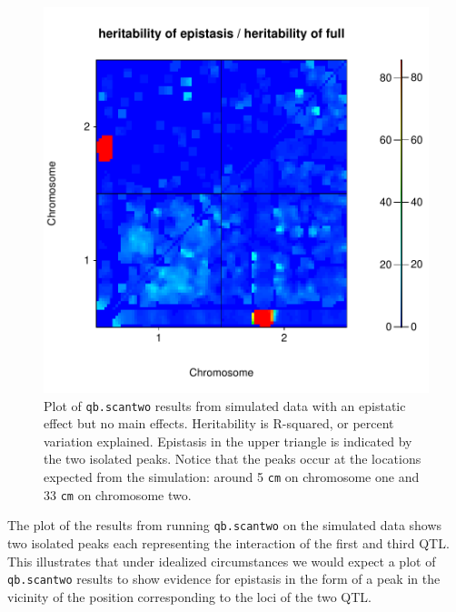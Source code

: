 \documentclass[12pt]{article}
\begin{document}
\begin{figure}
\includegraphics{scanPDF/FIG-Scantwo-SimEpi}
\caption{Plot of {\tt qb.scantwo} results from simulated data with an 
epistatic effect but no main effects.  Heritability is R-squared, or
percent variation explained. Epistasis in the upper triangle is
indicated by the two isolated peaks.  Notice that the peaks occur 
at  the locations expected from the simulation: around 5 {\tt cm} on 
chromosome one and 33 {\tt cm} on chromosome two.}
\end{figure}

\noindent
The plot of the results from running {\tt qb.scantwo} on the simulated 
data shows two isolated peaks each representing the  interaction of the 
first and third QTL.  This illustrates that under idealized 
circumstances we would expect a plot of {\tt qb.scantwo} results to show 
evidence for epistasis in the form of a peak in the vicinity of the 
position corresponding to the loci of the two QTL.
\end{document}
